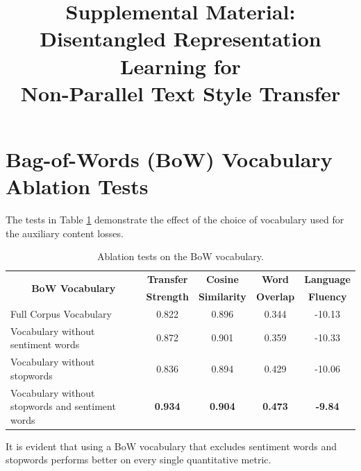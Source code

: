 \documentclass[letterpaper]{article}
\title{Supplemental Material:\\Disentangled Representation Learning for\\Non-Parallel Text Style Transfer}
\date{}
\author{}
\begin{document}
\maketitle
\graphicspath{{images/}}

\newcommand{\tabh}[1]{\multicolumn{1}{c|}{\textbf{#1}}}
\newcommand{\tabc}[2]{\multicolumn{1}{|c||}{\multirow{#1}{*}{\textbf{#2}}}}

\newcommand{\loss}[1]{J_{\text{#1}}}

\section{Bag-of-Words (BoW) Vocabulary Ablation Tests}

The tests in Table \ref{tab:bow-vocab-ablation} demonstrate the effect of the choice of vocabulary used for the auxiliary content losses.

\begin{table}[ht]
	\centering
	\begin{tabular}{| l || c | c | c | c |}
		\hline
		\tabc{2}{BoW Vocabulary}                         & \tabh{Transfer} & \tabh{Cosine}     & \tabh{Word}    & \tabh{Language} \\
		                                                 & \tabh{Strength} & \tabh{Similarity} & \tabh{Overlap} & \tabh{Fluency}  \\
		\hline
		\hline
		Full Corpus Vocabulary                           & 0.822           & 0.896             & 0.344          & -10.13          \\
		\hline
		Vocabulary without sentiment words               & 0.872           & 0.901             & 0.359          & -10.33          \\
		\hline
		Vocabulary without stopwords                     & 0.836           & 0.894             & 0.429          & -10.06          \\
		\hline
		Vocabulary without stopwords and sentiment words & \textbf{0.934}  & \textbf{0.904}    & \textbf{0.473} & \textbf{-9.84}  \\
		\hline
	\end{tabular}
	\caption{Ablation tests on the BoW vocabulary.}
	\label{tab:bow-vocab-ablation}
\end{table}

It is evident that using a BoW vocabulary that excludes sentiment words and stopwords performs better on every single quantitative metric.
\end{document}
